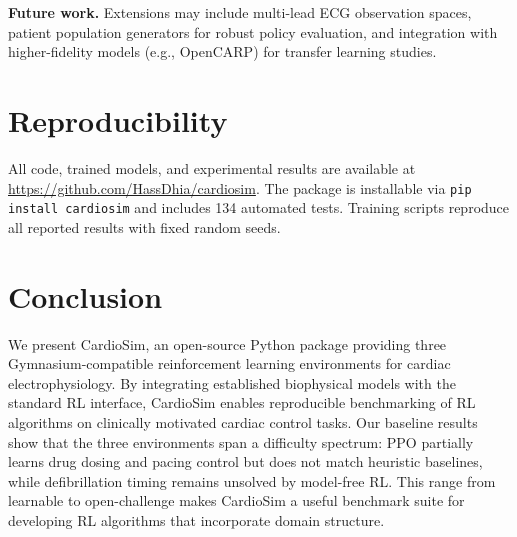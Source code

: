 \documentclass[11pt,a4paper]{article}
\begin{document}
\textbf{Future work.} Extensions may include multi-lead ECG observation spaces, patient population generators for robust policy evaluation, and integration with higher-fidelity models (e.g., OpenCARP) for transfer learning studies.

\section{Reproducibility}

All code, trained models, and experimental results are available at \url{https://github.com/HassDhia/cardiosim}. The package is installable via \texttt{pip install cardiosim} and includes 134 automated tests. Training scripts reproduce all reported results with fixed random seeds.

\section{Conclusion}

We present CardioSim, an open-source Python package providing three Gymnasium-compatible reinforcement learning environments for cardiac electrophysiology. By integrating established biophysical models with the standard RL interface, CardioSim enables reproducible benchmarking of RL algorithms on clinically motivated cardiac control tasks. Our baseline results show that the three environments span a difficulty spectrum: PPO partially learns drug dosing and pacing control but does not match heuristic baselines, while defibrillation timing remains unsolved by model-free RL. This range from learnable to open-challenge makes CardioSim a useful benchmark suite for developing RL algorithms that incorporate domain structure.



\end{document}
